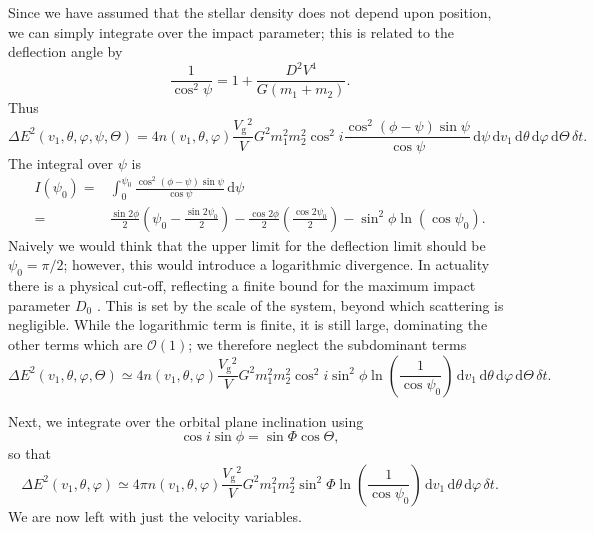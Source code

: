\documentclass[useAMS,usedcolumn,usegraphicx,usenatbib]{mn2e}
\newcommand{\sub}[1]{\ensuremath{_\mathrm{#1}}}
\newcommand{\dd}{\ensuremath{\mathrm{d}}}
\newcommand{\intd}[4]{\ensuremath{\displaystyle \int_{#1}^{#2}{#3}\,\dd{#4}}}
\newcommand{\recip}[1]{\ensuremath{\dfrac{1}{#1}}}
\newcommand{\order}[1]{\ensuremath{\mathcal{O}({#1})}}
\begin{document}
\begin{onecolumn}
Since we have assumed that the stellar density does not depend upon position, we can simply integrate over the impact parameter; this is related to the deflection angle by
\begin{equation}
\recip{\cos^2\psi} = 1 + \frac{D^2V^4}{G(m_1 + m_2)}.
\end{equation}
Thus
\begin{equation}
\Delta E^2(v_1,\theta,\varphi,\psi,\Theta) =  4 n(v_1,\theta,\varphi)\frac{V\sub{g}^2}{V}G^2m_1^2 m_2^2\cos^2i\frac{\cos^2(\phi-\psi)\sin\psi}{\cos\psi} \,\dd \psi\,\dd v_1\,\dd\theta\,\dd\varphi\,\dd\Theta\,\delta t.
\end{equation}
The integral over $\psi$ is
\begin{align}
I(\psi_0) = {} & \intd{0}{\psi_0}{\frac{\cos^2(\phi-\psi)\sin\psi}{\cos\psi}}{\psi}\\
 = {} & \frac{\sin 2\phi}{2}\left(\psi_0 - \frac{\sin 2\psi_0}{2}\right) - \frac{\cos 2\phi}{2}\left(\frac{\cos 2\psi_0}{2}\right) - \sin^2\phi\ln(\cos\psi_0).
\end{align}
Naively we would think that the upper limit for the deflection limit should be $\psi_0 = \pi/2$; however, this would introduce a logarithmic divergence. In actuality there is a physical cut-off, reflecting a finite bound for the maximum impact parameter $D_0$ \citep{Weinberg1986}. This is set by the scale of the system, beyond which scattering is negligible. While the logarithmic term is finite, it is still large, dominating the other terms which are $\order{1}$; we therefore neglect the subdominant terms
\begin{equation}
\Delta E^2(v_1,\theta,\varphi,\Theta) \simeq  4 n(v_1,\theta,\varphi)\frac{V\sub{g}^2}{V}G^2m_1^2 m_2^2\cos^2i\sin^2\phi\ln\left(\recip{\cos\psi_0}\right)\,\dd v_1\,\dd\theta\,\dd\varphi\,\dd\Theta\,\delta t.
\end{equation}

Next, we integrate over the orbital plane inclination using
\begin{equation}
\cos i\sin\phi = \sin\Phi\cos\Theta,
\end{equation}
so that
\begin{equation}
\Delta E^2(v_1,\theta,\varphi) \simeq  4\pi n(v_1,\theta,\varphi)\frac{V\sub{g}^2}{V}G^2m_1^2 m_2^2\sin^2\Phi\ln\left(\recip{\cos\psi_0}\right)\,\dd v_1\,\dd\theta\,\dd\varphi\,\delta t.
\end{equation}
We are now left with just the velocity variables.


\end{onecolumn}
\end{document}
